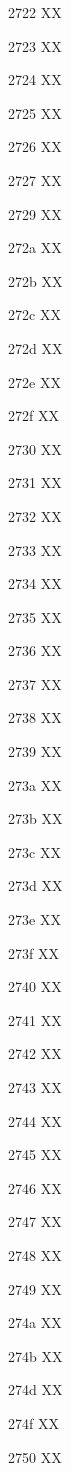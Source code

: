 \documentclass[11pt]{article}
\begin{document}
2722 X{}X

2723 X{}X

2724 X{}X

2725 X{}X

2726 X{}X

2727 X{}X

2729 X{}X

272a X{}X

272b X{}X

272c X{}X

272d X{}X

272e X{}X

272f X{}X

2730 X{}X

2731 X{}X

2732 X{}X

2733 X{}X

2734 X{}X

2735 X{}X

2736 X{}X

2737 X{}X

2738 X{}X

2739 X{}X

273a X{}X

273b X{}X

273c X{}X

273d X{}X

273e X{}X

273f X{}X

2740 X{}X

2741 X{}X

2742 X{}X

2743 X{}X

2744 X{}X

2745 X{}X

2746 X{}X

2747 X{}X

2748 X{}X

2749 X{}X

274a X{}X

274b X{}X

274d X{}X

274f X{}X

2750 X{}X
\end{document}
